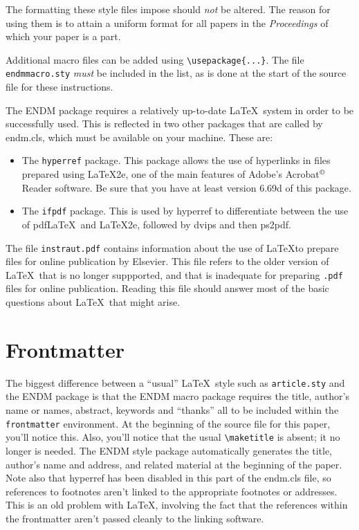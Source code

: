 \documentclass{endm}
\begin{document}
The formatting these style files impose should \emph{not} be altered.
The reason for using them is to attain a uniform format for all papers
in the \emph{Proceedings} of which your paper is a part.

Additional macro files can be added using \verb+\usepackage{...}+.
The file \texttt{endmmacro.sty} \emph{must} be included in the
list, as is done at the start of the source file for these
instructions.

The ENDM package requires a relatively up-to-date \LaTeX\ system in
order to be successfully used. This is reflected in two other packages
that are called by endm.cls, which must be available on your machine.
These are:
\begin{itemize}
\item The \texttt{hyperref} package. This package allows the use of
hyperlinks in files prepared using \LaTeX 2e, one of the main features
of Adobe's Acrobat$^{\copyright}$ Reader software. Be sure that you
have at least version 6.69d of this package.
\item The \texttt{ifpdf} package. This is used by hyperref to
differentiate between the use of pdf\LaTeX\ and \LaTeX 2e, followed
by dvips and then ps2pdf.
\end{itemize}

The file \texttt{instraut.pdf} contains information about the use of
\LaTeX to prepare files for online publication by Elsevier. This file
refers to the older version of \LaTeX\ that is no longer suppported,
and that is inadequate for preparing \texttt{.pdf} files for online
publication. Reading this file should answer most of the basic
questions about \LaTeX\ that might arise.


\section{Frontmatter}

The biggest difference between a ``usual'' \LaTeX\ style such as
\texttt{article.sty} and the ENDM package is that the ENDM macro
package requires the title, author's name or names, abstract, keywords
and ``thanks'' all to be included within the \texttt{frontmatter}
environment. At the beginning of the source file for this paper, you'll
notice this. Also, you'll notice that the usual \verb+\maketitle+ is
absent; it no longer is needed. The ENDM style package automatically
generates the title, author's name and address, and related material at
the beginning of the paper. Note also that hyperref has been disabled in
this part of the endm.cls file, so references to footnotes aren't linked
to the appropriate footnotes or addresses. This is an old problem with
\LaTeX, involving the fact that the references within the frontmatter
aren't passed cleanly to the linking software.
\end{document}
